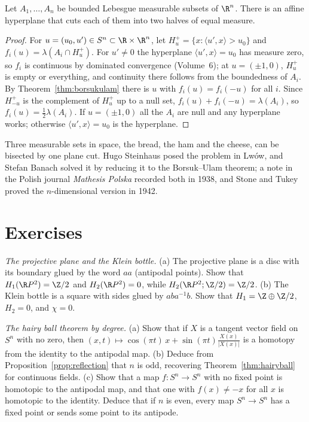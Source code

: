 \begin{corollary}\label{cor:hamsandwich}
Let $A_1,\dots,A_n$ be bounded Lebesgue measurable subsets of $\R^n$. There is an affine hyperplane that cuts each of them into two halves of equal measure.
\end{corollary}

\begin{proof}
For $u=(u_0,u')\in S^n\subset\R\times\R^n$, let $H_u^+=\{x:\langle u',x\rangle>u_0\}$ and $f_i(u)=\lambda(A_i\cap H_u^+)$. For $u'\ne0$ the hyperplane $\langle u',x\rangle=u_0$ has measure zero, so $f_i$ is continuous by
dominated convergence (Volume~6); at $u=(\pm1,0)$, $H_u^+$ is empty or everything, and continuity there follows from the boundedness of $A_i$. By Theorem~\ref{thm:borsukulam} there is $u$ with $f_i(u)=f_i(-u)$ for all
$i$. Since $H_{-u}^+$ is the complement of $H_u^+$ up to a null set, $f_i(u)+f_i(-u)=\lambda(A_i)$, so $f_i(u)=\frac12\lambda(A_i)$. If $u=(\pm1,0)$ all the $A_i$ are null and any hyperplane works; otherwise
$\langle u',x\rangle=u_0$ is the hyperplane.
\end{proof}

Three measurable sets in space, the bread, the ham and the cheese, can be bisected by one plane cut. Hugo Steinhaus posed the problem in Lw\'ow, and
Stefan Banach solved it by reducing it to the Borsuk--Ulam theorem; a note in the Polish journal \emph{Mathesis Polska} recorded both in 1938, and Stone and Tukey proved the
$n$-dimensional version in 1942.

\section{Exercises}

\begin{exercise}[$\star$]\label{ex:kleinrp2}
\emph{The projective plane and the Klein bottle.} (a) The projective plane is a disc with its boundary glued by the word $aa$ (antipodal points). Show that $H_1(\R P^2)=\Z/2$ and $H_2(\R P^2)=0$, while
$H_2(\R P^2;\Z/2)=\Z/2$. (b) The Klein bottle is a square with sides glued by $aba^{-1}b$. Show that $H_1=\Z\oplus\Z/2$, $H_2=0$, and $\chi=0$.
\end{exercise}

\begin{exercise}[$\star\star$]\label{ex:hairydegree}
\emph{The hairy ball theorem by degree.} (a) Show that if $X$ is a tangent vector field on $S^n$ with no zero, then $(x,t)\mapsto\cos(\pi t)\,x+\sin(\pi t)\frac{X(x)}{|X(x)|}$ is a homotopy from the identity to the antipodal
map. (b) Deduce from Proposition~\ref{prop:reflection} that $n$ is odd, recovering Theorem~\ref{thm:hairyball} for continuous fields. (c) Show that a map $f\colon S^n\to S^n$ with no fixed point is homotopic to the
antipodal map, and that one with $f(x)\ne-x$ for all $x$ is homotopic to the identity. Deduce that if $n$ is even, every map $S^n\to S^n$ has a fixed point or sends some point to its antipode.
\end{exercise}

